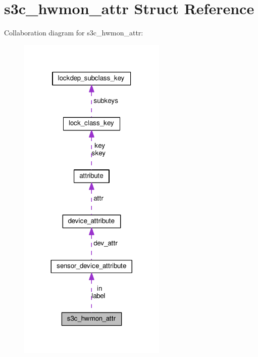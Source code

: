 \hypertarget{structs3c__hwmon__attr}{}\section{s3c\+\_\+hwmon\+\_\+attr Struct Reference}
\label{structs3c__hwmon__attr}


Collaboration diagram for s3c\+\_\+hwmon\+\_\+attr\+:
\nopagebreak
\begin{figure}[H]
\begin{center}
\leavevmode
\includegraphics[width=200pt]{structs3c__hwmon__attr__coll__graph}
\end{center}
\end{figure}
